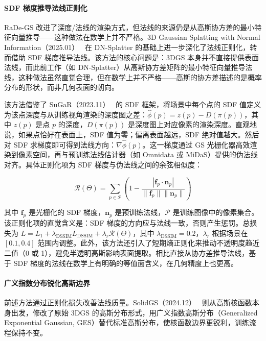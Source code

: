 \paragraph{SDF 梯度推导法线正则化}

RaDe-GS 改进了深度/法线的渲染方式，但法线的来源仍是从高斯协方差的最小特征向量推导——这种做法在数学上并不严格。3D Gaussian Splatting with Normal Information（2025.01）~\cite{2501_08370} 在 DN-Splatter 的基础上进一步深化了法线正则化，转而借助 SDF 梯度推导法线。该方法的核心问题是：3DGS 本身并不直接提供表面法线，而此前工作（如 DN-Splatter）从高斯协方差矩阵的最小特征向量推导法线，这种做法虽然直觉合理，但在数学上并不严格——高斯的协方差描述的是概率分布的形状，而非几何表面的朝向。

该方法借鉴了 SuGaR（2023.11）~\cite{2311_12775} 的 SDF 框架，将场景中每个点的 SDF 值定义为该点深度与从训练视角渲染的深度图之差：$\hat{\phi}(p) = z(p) - D(\pi(p))$，其中 $z(p)$ 是点 $p$ 的深度，$D(\pi(p))$ 是深度图上对应像素的渲染深度。直观地说，如果点恰好在表面上，SDF 值为零；偏离表面越远，SDF 绝对值越大。然后对 SDF 求梯度即可得到法线方向：$\nabla \hat{\phi}(p)$。这一梯度通过 GS 光栅化器高效渲染到像素空间，再与预训练法线估计器（如 Omnidata 或 MiDaS）提供的伪法线对齐。具体正则化项为 SDF 梯度与伪法线之间的余弦相似度：

\begin{equation}
    \mathcal{R}(\Theta) = \sum_{p \in \mathcal{P}} \left(1 - \frac{|\mathbf{f}_p \cdot \mathbf{n}_p|}{\|\mathbf{f}_p\| \|\mathbf{n}_p\|}\right)
\end{equation}

其中 $\mathbf{f}_p$ 是光栅化的 SDF 梯度，$\mathbf{n}_p$ 是预训练法线，$\mathcal{P}$ 是训练图像中的像素集合。该正则化项的直觉含义是：SDF 梯度的方向应与法线一致，否则产生惩罚。总损失为 $L = L_1 + \lambda_{\text{DSSIM}} L_{\text{DSSIM}} + \lambda_r \mathcal{R}(\Theta)$，其中 $\lambda_{\text{DSSIM}} = 0.2$，$\lambda_r$ 根据场景在 $[0.1, 0.4]$ 范围内调整。此外，该方法还引入了短期熵正则化来推动不透明度趋近二值（0 或 1），避免半透明高斯影响表面提取。相比直接从协方差推导法线，基于 SDF 梯度的法线在数学上有明确的等值面含义，在几何精度上也更高。

\paragraph{广义指数分布锐化高斯边界}

前述方法通过正则化损失改善法线质量。SolidGS（2024.12）~\cite{2412_15400} 则从高斯核函数本身出发，修改了原始 3DGS 的高斯分布形式，用广义指数高斯分布（Generalized Exponential Gaussian, GES）替代标准高斯分布，使核函数边界更锐利，训练流程保持不变。


